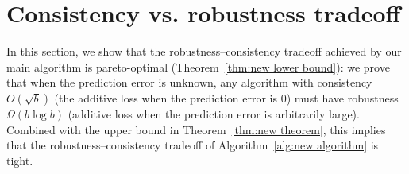 \section{Consistency vs. robustness tradeoff}
\label{sec: consistency vs robustness tradeoff}

In this section, we show that the robustness–consistency tradeoff achieved by our main algorithm is pareto-optimal (Theorem~\ref{thm:new lower bound}): we prove that when the prediction error is unknown, any algorithm with consistency $O(\sqrt{b})$ (the additive loss when the prediction error is $0$) must have robustness $\Omega(b \log b)$ (additive loss when the prediction error is arbitrarily large). Combined with the upper bound in Theorem~\ref{thm:new theorem}, this implies that the robustness–consistency tradeoff of Algorithm~\ref{alg:new algorithm} is tight.


